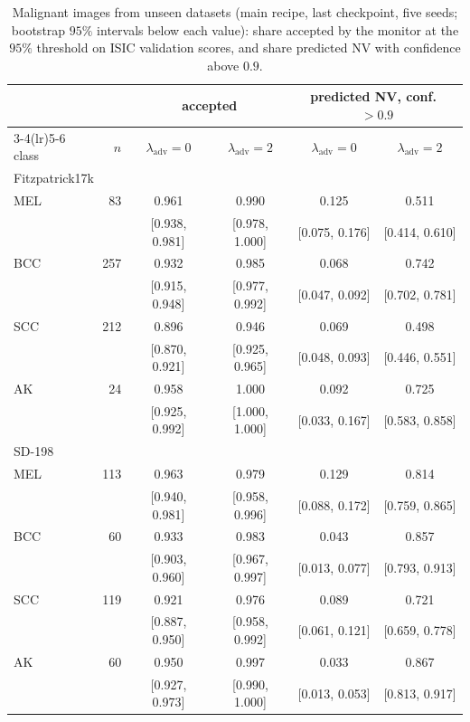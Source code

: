 \documentclass{midl}
\newcommand{\lam}{\lambda_{\mathrm{adv}}}
\begin{document}
\begin{table}[h]
\centering
\caption{Malignant images from unseen datasets (main recipe, last checkpoint, five seeds;
bootstrap $95\%$ intervals below each value): share accepted by the monitor at the $95\%$ threshold on ISIC validation
scores, and share predicted NV with confidence above $0.9$.}
\label{tab:clinical}
\begin{tabular}{lrcccc}
\toprule
& & \multicolumn{2}{c}{accepted} & \multicolumn{2}{c}{predicted NV, conf.\ $>0.9$} \\
\cmidrule(lr){3-4}\cmidrule(lr){5-6}
class & $n$ & $\lam=0$ & $\lam=2$ & $\lam=0$ & $\lam=2$ \\
\midrule
\multicolumn{6}{l}{Fitzpatrick17k} \\
MEL & 83 & 0.961 & 0.990 & 0.125 & 0.511 \\
 & & [0.938, 0.981] & [0.978, 1.000] & [0.075, 0.176] & [0.414, 0.610] \\
BCC & 257 & 0.932 & 0.985 & 0.068 & 0.742 \\
 & & [0.915, 0.948] & [0.977, 0.992] & [0.047, 0.092] & [0.702, 0.781] \\
SCC & 212 & 0.896 & 0.946 & 0.069 & 0.498 \\
 & & [0.870, 0.921] & [0.925, 0.965] & [0.048, 0.093] & [0.446, 0.551] \\
AK & 24 & 0.958 & 1.000 & 0.092 & 0.725 \\
 & & [0.925, 0.992] & [1.000, 1.000] & [0.033, 0.167] & [0.583, 0.858] \\
\midrule
\multicolumn{6}{l}{SD-198} \\
MEL & 113 & 0.963 & 0.979 & 0.129 & 0.814 \\
 & & [0.940, 0.981] & [0.958, 0.996] & [0.088, 0.172] & [0.759, 0.865] \\
BCC & 60 & 0.933 & 0.983 & 0.043 & 0.857 \\
 & & [0.903, 0.960] & [0.967, 0.997] & [0.013, 0.077] & [0.793, 0.913] \\
SCC & 119 & 0.921 & 0.976 & 0.089 & 0.721 \\
 & & [0.887, 0.950] & [0.958, 0.992] & [0.061, 0.121] & [0.659, 0.778] \\
AK & 60 & 0.950 & 0.997 & 0.033 & 0.867 \\
 & & [0.927, 0.973] & [0.990, 1.000] & [0.013, 0.053] & [0.813, 0.917] \\
\bottomrule
\end{tabular}
\end{table}
\end{document}
